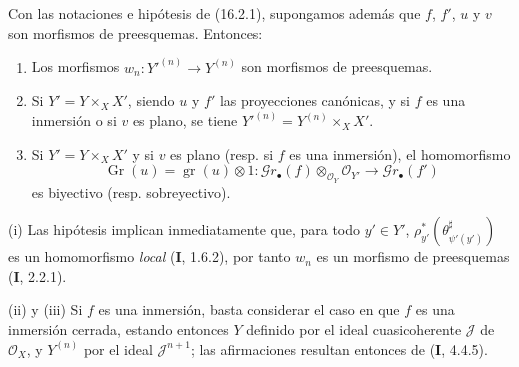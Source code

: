 \begin{proposition}[16.2.2]
\label{IV.16.2.2}
Con las notaciones e hipótesis de \textup{(16.2.1)}, supongamos además que $f$, $f'$,
$u$ y $v$ son morfismos de preesquemas. Entonces:
\begin{enumerate}
\item[\textup{(i)}] Los morfismos $w_n:Y'^{(n)}\to Y^{(n)}$ son morfismos de
preesquemas.
\item[\textup{(ii)}] Si $Y'=Y\times_X X'$, siendo $u$ y $f'$ las proyecciones
canónicas, y si $f$ es una inmersión \textup{o} si $v$ es plano, se tiene
$Y'^{(n)}=Y^{(n)}\times_X X'$.
\item[\textup{(iii)}] Si $Y'=Y\times_X X'$ y si $v$ es plano \textup{(resp.} si $f$ es una
inmersión\textup{)}, el homomorfismo
\[
  \operatorname{Gr}(u)=\operatorname{gr}(u)\otimes 1:
  \mathscr{G}r_\bullet(f)\otimes_{\mathcal{O}_Y}\mathcal{O}_{Y'}
  \longrightarrow\mathscr{G}r_\bullet(f')
\]
es biyectivo \textup{(resp.} sobreyectivo\textup{)}.
\end{enumerate}
\end{proposition}

\noindent(i) Las hipótesis implican inmediatamente que, para todo $y'\in Y'$,
$\rho_{y'}^*(\theta_{\psi'(y')}^\sharp)$ es un homomorfismo \emph{local} (\textbf I, 1.6.2),
por tanto $w_n$ es un morfismo de preesquemas (\textbf I, 2.2.1).

\noindent(ii) y (iii) Si $f$ es una inmersión, basta considerar el caso en que
$f$ es una inmersión cerrada, estando entonces $Y$ definido por el ideal
cuasicoherente $\mathscr{J}$ de $\mathcal{O}_X$, y $Y^{(n)}$ por el ideal
$\mathscr{J}^{n+1}$; las afirmaciones resultan entonces de (\textbf I, 4.4.5).


